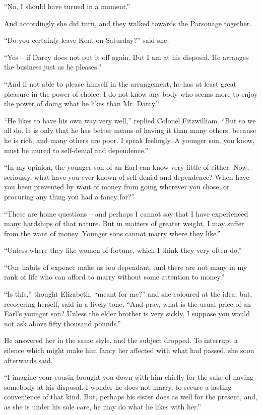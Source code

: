 “No, I should have turned in a moment.”

And accordingly she did turn, and they walked towards
the Parsonage together.

“Do you certainly leave Kent on Saturday?” said she.

“Yes -- if Darcy does not put it off again. But I am
at his disposal. He arranges the business just as he
pleases.”

“And if not able to please himself in the arrangement,
he has at least great pleasure in the power of choice. I do
not know any body who seems more to enjoy the power
of doing what he likes than Mr. Darcy.”

“He likes to have his own way very well,” replied
Colonel Fitzwilliam. “But so we all do. It is only that
he has better means of having it than many others,
because he is rich, and many others are poor. I speak
feelingly. A younger son, you know, must be inured to
self-denial and dependence.”

“In my opinion, the younger son of an Earl can know
very little of either. Now, seriously, what have you ever
known of self-denial and dependence? When have you
been prevented by want of money from going wherever
you chose, or procuring any thing you had a fancy for?”

“These are home questions -- and perhaps I cannot say
that I have experienced many hardships of that nature.
But in matters of greater weight, I may suffer from the
want of money. Younger sons cannot marry where they
like.”

“Unless where they like women of fortune, which I think
they very often do.”

“Our habits of expence make us too dependant, and
there are not many in my rank of life who can afford to
marry without some attention to money.”

“Is this,” thought Elizabeth, “meant for me?” and
she coloured at the idea; but, recovering herself, said
in a lively tone, “And pray, what is the usual price of an
Earl’s younger son? Unless the elder brother is very
sickly, I suppose you would not ask above fifty thousand
pounds.”

He answered her in the same style, and the subject
dropped. To interrupt a silence which might make him
fancy her affected with what had passed, she soon afterwards
said,

“I imagine your cousin brought you down with him
chiefly for the sake of having somebody at his disposal.
I wonder he does not marry, to secure a lasting convenience
of that kind. But, perhaps his sister does as
well for the present, and, as she is under his sole care,
he may do what he likes with her.”

